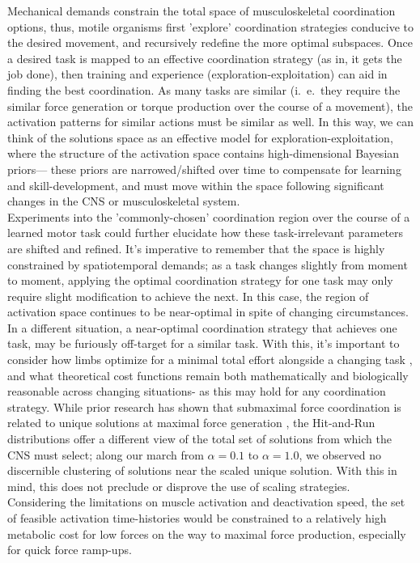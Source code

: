 Mechanical demands constrain the total space of musculoskeletal coordination options, thus, motile organisms first 'explore' coordination strategies conducive to the desired movement, and recursively redefine the more optimal subspaces.
Once a desired task is mapped to an effective coordination strategy (as in, it gets the job done), then training and experience (exploration-exploitation) can aid in finding the best coordination.
As many tasks are similar (i.\ e.\ they require the similar force generation or torque production over the course of a movement),  the activation patterns for similar actions must be similar as well.
In this way, we can think of the solutions space as an effective model for exploration-exploitation, where the structure of the activation space contains high-dimensional Bayesian priors--- these priors are narrowed/shifted over time to compensate for learning and skill-development, and must move within the space following significant changes in the CNS or musculoskeletal system.\\
Experiments into the 'commonly-chosen' coordination region over the course of a learned motor task could further elucidate how these task-irrelevant parameters are shifted and refined.
It's imperative to remember that the space is highly constrained by spatiotemporal demands;
as a task changes slightly from moment to moment, applying the optimal coordination strategy for one task may only require slight modification to achieve the next. In this case, the region of activation space continues to be near-optimal in spite of changing circumstances. In a different situation, a near-optimal coordination strategy that achieves one task, may be furiously off-target for a similar task.
With this, it's important to consider how limbs optimize for a minimal total effort alongside a changing task \cite{todorov2002optimal}, and what theoretical cost functions remain both mathematically and biologically reasonable across changing situations- as this may hold for any coordination strategy.
While prior research has shown that submaximal force coordination is related to unique solutions at maximal force generation \cite{Valero-Cuevas2000Scaling}, the Hit-and-Run distributions offer a different view of the total set of solutions from which the CNS must select; along our march from $\alpha=0.1$ to $\alpha =1.0$, we observed no discernible clustering of solutions near the scaled unique solution. With this in mind, this does not preclude or disprove the use of scaling strategies.\\
Considering the limitations on muscle activation and deactivation speed, the set of feasible activation time-histories would be constrained to a relatively high metabolic cost for low forces on the way to maximal force production, especially for quick force ramp-ups.

